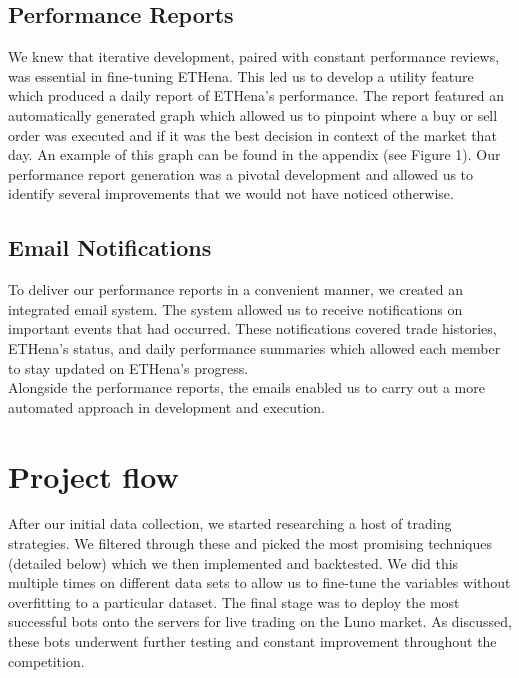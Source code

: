 \documentclass[12pt]{article}
\begin{document}
\begin{multicols}{2}
    \subsection{Performance Reports}
    We knew that iterative development, paired with constant performance reviews, was essential in fine-tuning ETHena. This led us to develop a utility feature which produced a daily report of ETHena's performance. The report featured an automatically generated graph which allowed us to pinpoint where a buy or sell order was executed and if it was the best decision in context of the market that day. An example of this graph can be found in the appendix (see Figure 1). Our performance report generation was a pivotal development and allowed us to identify several improvements that we would not have noticed otherwise.
    \subsection{Email Notifications}
    To deliver our performance reports in a convenient manner, we created an integrated email system. The system allowed us to receive notifications on important events that had occurred. These notifications covered trade histories, ETHena's status, and daily performance summaries which allowed each member to stay updated on ETHena's progress.
    \\
    Alongside the performance reports, the emails enabled us to carry out a more automated approach in development and execution.

    \section{Project flow}

    After our initial data collection, we started researching a host of trading strategies. We filtered through these and picked the most promising techniques (detailed below) which we then implemented and backtested. We did this multiple times on different data sets to allow us to fine-tune the variables without overfitting to a particular dataset. The final stage was to deploy the most successful bots onto the servers for live trading on the Luno market. As discussed, these bots underwent further testing and constant improvement throughout the competition.
    \begin{center}
\end{center}
\end{multicols}
\end{document}
